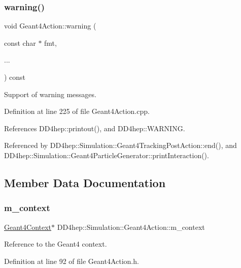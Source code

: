 \subsubsection{\texorpdfstring{warning()}{warning()}}
{\footnotesize\ttfamily void Geant4\+Action\+::warning (\begin{DoxyParamCaption}\item[{const char $\ast$}]{fmt,  }\item[{}]{... }\end{DoxyParamCaption}) const}



Support of warning messages. 



Definition at line 225 of file Geant4\+Action.\+cpp.



References D\+D4hep\+::printout(), and D\+D4hep\+::\+W\+A\+R\+N\+I\+NG.



Referenced by D\+D4hep\+::\+Simulation\+::\+Geant4\+Tracking\+Post\+Action\+::end(), and D\+D4hep\+::\+Simulation\+::\+Geant4\+Particle\+Generator\+::print\+Interaction().



\subsection{Member Data Documentation}
\hypertarget{class_d_d4hep_1_1_simulation_1_1_geant4_action_a5cdb706a8dea3dea288b5b9f65398c1d}{}\label{class_d_d4hep_1_1_simulation_1_1_geant4_action_a5cdb706a8dea3dea288b5b9f65398c1d} 
\subsubsection{\texorpdfstring{m\+\_\+context}{m\_context}}
{\footnotesize\ttfamily \hyperlink{class_d_d4hep_1_1_simulation_1_1_geant4_context}{Geant4\+Context}$\ast$ D\+D4hep\+::\+Simulation\+::\+Geant4\+Action\+::m\+\_\+context\hspace{0.3cm}{\ttfamily [protected]}}



Reference to the Geant4 context. 



Definition at line 92 of file Geant4\+Action.\+h.



